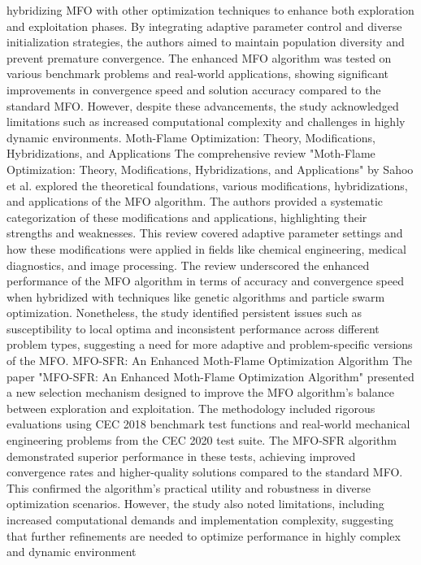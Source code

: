 \documentclass[conference]{IEEEtran}
\begin{document}
hybridizing MFO with other optimization techniques to 
enhance both exploration and exploitation phases. By 
integrating adaptive parameter control and diverse 
initialization strategies, the authors aimed to maintain 
population diversity and prevent premature convergence. 
The enhanced MFO algorithm was tested on various 
benchmark problems and real-world applications, showing 
significant improvements in convergence speed and solution 
accuracy compared to the standard MFO. However, despite 
these advancements, the study acknowledged limitations 
such as increased computational complexity and challenges 
in highly dynamic environments.
Moth-Flame Optimization: Theory, Modifications, 
Hybridizations, and Applications
The comprehensive review "Moth-Flame Optimization: 
Theory, Modifications, Hybridizations, and Applications" 
by Sahoo et al. explored the theoretical foundations, various 
modifications, hybridizations, and applications of the MFO 
algorithm. The authors provided a systematic categorization 
of these modifications and applications, highlighting their 
strengths and weaknesses. This review covered adaptive 
parameter settings and how these modifications were 
applied in fields like chemical engineering, medical 
diagnostics, and image processing. The review underscored 
the enhanced performance of the MFO algorithm in terms 
of accuracy and convergence speed when hybridized with 
techniques like genetic algorithms and particle swarm 
optimization. Nonetheless, the study identified persistent 
issues such as susceptibility to local optima and inconsistent 
performance across different problem types, suggesting a 
need for more adaptive and problem-specific versions of the 
MFO.
MFO-SFR: An Enhanced Moth-Flame Optimization 
Algorithm
The paper "MFO-SFR: An Enhanced Moth-Flame 
Optimization Algorithm" presented a new selection 
mechanism designed to improve the MFO algorithm's 
balance between exploration and exploitation. The 
methodology included rigorous evaluations using CEC 
2018 benchmark test functions and real-world mechanical 
engineering problems from the CEC 2020 test suite. The 
MFO-SFR algorithm demonstrated superior performance in 
these tests, achieving improved convergence rates and 
higher-quality solutions compared to the standard MFO. 
This confirmed the algorithm's practical utility and 
robustness in diverse optimization scenarios. However, the 
study also noted limitations, including increased 
computational demands and implementation complexity, 
suggesting that further refinements are needed to optimize 
performance in highly complex and dynamic environment


\end{document}
